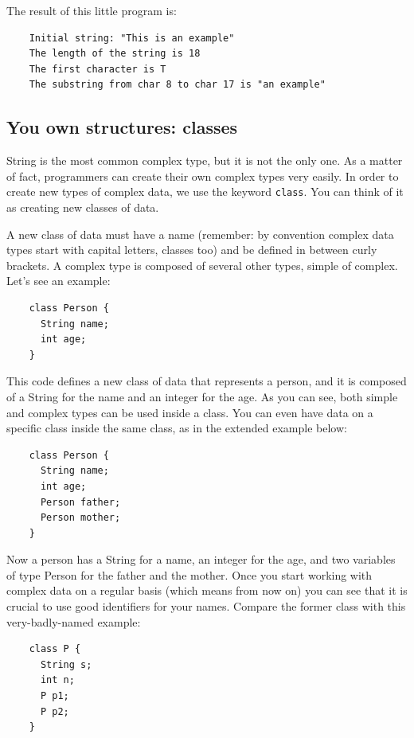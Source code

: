 The result of this little program is:

\begin{verbatim}
    Initial string: "This is an example"
    The length of the string is 18
    The first character is T
    The substring from char 8 to char 17 is "an example"
\end{verbatim}


\subsection{You own structures: classes}
\label{sec:you-own-structures}

String is the most common complex type, but it is not the only one. As
a matter of fact, programmers can create their own complex
types very easily. In order to create new types of complex data, we use the
keyword \verb+class+. You can think of it as creating new classes of
data. 

A new class of data must have a name (remember: by convention complex
data types start with capital letters, classes too) and be defined in
between curly brackets. A complex type is composed of several other
types, simple of complex. Let's see an example: 

\begin{verbatim}
    class Person {
      String name;
      int age;
    }
\end{verbatim}

This code defines a new class of data that represents a person, and
it is composed of a String for the name and an integer for the age. As
you can see, both simple and complex types can be used inside a
class. You can even have data on a specific class inside the same
class, as in the extended example below: 

\begin{verbatim}
    class Person {
      String name;
      int age;
      Person father;
      Person mother;
    }
\end{verbatim}

Now a person has a String for a name, an integer for the age, and two
variables of type Person for the father and the mother. Once you start
working with complex data on a regular basis (which means from now on)
you can see that it is crucial to use good identifiers for your
names. Compare the former class with this very-badly-named example: 

\begin{verbatim}
    class P {
      String s;
      int n;
      P p1;
      P p2;
    }
\end{verbatim}

